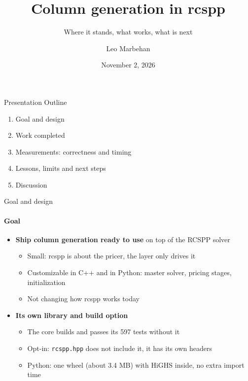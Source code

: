 \documentclass[aspectratio=169]{beamer}
\title{Column generation in rcspp}
\subtitle{Where it stands, what works, what is next}
\author{Leo Marbehan}
\date{November 2, 2026}
\begin{document}
\begin{frame}[plain]
  \titlepage
\end{frame}

\begin{frame}{Presentation Outline}
  \begin{enumerate}
    \item Goal and design
    \item Work completed
    \item Measurements: correctness and timing
    \item Lessons, limits and next steps
    \item Discussion
  \end{enumerate}
\end{frame}

\begin{frame}{Goal and design}
  \framesubtitle{Goal}

  \begin{itemize}
    \item \textbf{Ship column generation ready to use} on top of the RCSPP solver
      \begin{itemize}
        \item Small: rcspp is about the pricer, the layer only drives it
        \item Customizable in C++ and in Python: master solver, pricing stages, initialization
        \item Not changing how rcspp works today
      \end{itemize}
    \item \textbf{Its own library and build option}
      \begin{itemize}
        \item The core builds and passes its 597 tests without it
        \item Opt-in: \texttt{rcspp.hpp} does not include it, it has its own headers
        \item Python: one wheel (about 3.4 MB) with HiGHS inside, no extra import time
      \end{itemize}
  \end{itemize}
\end{frame}
\end{document}
